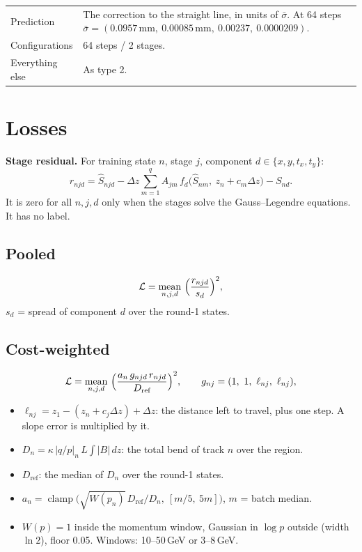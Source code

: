 \documentclass[11pt,a4paper]{article}
\newcommand{\dz}{\Delta z}
\newcommand{\Shat}{\hat S}
\begin{document}
\begin{center}
\footnotesize
\begin{tabularx}{\textwidth}{@{}l X@{}}
\toprule
Prediction & The correction to the straight line, in units of $\bar\sigma$. At 64 steps $\bar\sigma = (0.0957\,\text{mm},\ 0.00085\,\text{mm},\ 0.00237,\ 0.0000209)$. \\
Configurations & 64 steps / 2 stages. \\
Everything else & As type 2. \\
\bottomrule
\end{tabularx}
\end{center}

\newpage
\section{Losses}

\textbf{Stage residual.} For training state $n$, stage $j$, component $d \in \{x, y, t_x, t_y\}$:
\[
r_{njd} = \Shat_{njd} - \dz\sum_{m=1}^{q} A_{jm}\, f_d\bigl(\Shat_{nm},\ z_n + c_m\dz\bigr) - S_{nd}.
\]
It is zero for all $n, j, d$ only when the stages solve the Gauss--Legendre equations. It has no label.

\subsection*{Pooled}
\[
\mathcal{L} = \operatorname*{mean}_{n,j,d}\ \Bigl(\frac{r_{njd}}{s_d}\Bigr)^2,
\]
$s_d$ = spread of component $d$ over the round-1 states.

\subsection*{Cost-weighted}
\[
\mathcal{L} = \operatorname*{mean}_{n,j,d}\ \Bigl(\frac{a_n\, g_{njd}\, r_{njd}}{D_{\text{ref}}}\Bigr)^2,
\qquad g_{nj} = (1,\ 1,\ \ell_{nj},\ \ell_{nj}),
\]
\begin{itemize}
\item $\ell_{nj} = z_1 - (z_n + c_j\dz) + \dz$: the distance left to travel, plus one step. A slope error is multiplied by it.
\item $D_n = \kappa\,|q/p|_n\, L \int |B|\,dz$: the total bend of track $n$ over the region.
\item $D_{\text{ref}}$: the median of $D_n$ over the round-1 states.
\item $a_n = \operatorname{clamp}\bigl(\sqrt{W(p_n)}\,D_{\text{ref}}/D_n,\ [m/5,\ 5m]\bigr)$, $m$ = batch median.
\item $W(p) = 1$ inside the momentum window, Gaussian in $\log p$ outside (width $\ln 2$), floor 0.05. Windows: 10--50\,GeV or 3--8\,GeV.
\end{itemize}
\end{document}

